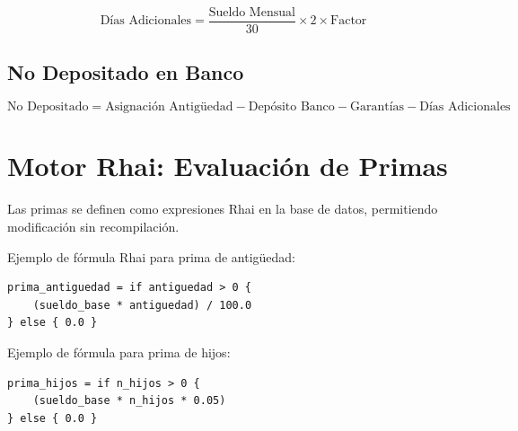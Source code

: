\[
\text{Días Adicionales} = \frac{\text{Sueldo Mensual}}{30} \times 2 \times \text{Factor}
\]

\bigskip

\subsection{No Depositado en Banco}

\[
\text{No Depositado} = \text{Asignación Antigüedad} - \text{Depósito Banco} - \text{Garantías} - \text{Días Adicionales}
\]

\bigskip

\section{Motor Rhai: Evaluación de Primas}

Las primas se definen como expresiones Rhai en la base de datos, permitiendo modificación sin recompilación.

\bigskip

Ejemplo de fórmula Rhai para prima de antigüedad:
\begin{verbatim}
prima_antiguedad = if antiguedad > 0 { 
    (sueldo_base * antiguedad) / 100.0 
} else { 0.0 }
\end{verbatim}

\bigskip

Ejemplo de fórmula para prima de hijos:
\begin{verbatim}
prima_hijos = if n_hijos > 0 {
    (sueldo_base * n_hijos * 0.05)
} else { 0.0 }
\end{verbatim}

\vfill
\newpage
